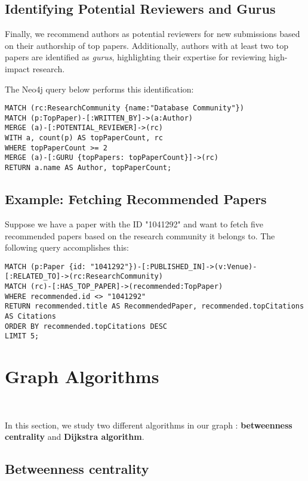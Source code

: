 \documentclass{article}
\begin{document}
\subsection{Identifying Potential Reviewers and Gurus}

Finally, we recommend authors as potential reviewers for new submissions based on their authorship of top papers. Additionally, authors with at least two top papers are identified as \textit{gurus}, highlighting their expertise for reviewing high-impact research.

The Neo4j query below performs this identification:

\begin{verbatim}
MATCH (rc:ResearchCommunity {name:"Database Community"})
MATCH (p:TopPaper)-[:WRITTEN_BY]->(a:Author)
MERGE (a)-[:POTENTIAL_REVIEWER]->(rc)
WITH a, count(p) AS topPaperCount, rc
WHERE topPaperCount >= 2
MERGE (a)-[:GURU {topPapers: topPaperCount}]->(rc)
RETURN a.name AS Author, topPaperCount;
\end{verbatim}

\subsection{Example: Fetching Recommended Papers}

Suppose we have a paper with the ID "1041292" and want to fetch five recommended papers based on the research community it belongs to. The following query accomplishes this:

\begin{verbatim}
MATCH (p:Paper {id: "1041292"})-[:PUBLISHED_IN]->(v:Venue)-[:RELATED_TO]->(rc:ResearchCommunity)
MATCH (rc)-[:HAS_TOP_PAPER]->(recommended:TopPaper)
WHERE recommended.id <> "1041292"
RETURN recommended.title AS RecommendedPaper, recommended.topCitations AS Citations
ORDER BY recommended.topCitations DESC
LIMIT 5;
\end{verbatim}

\section{Graph Algorithms} \

In this section, we study two different algorithms in our graph : \textbf{betweenness centrality} and \textbf{Dijkstra algorithm}.

\subsection{Betweenness centrality} \
\end{document}
